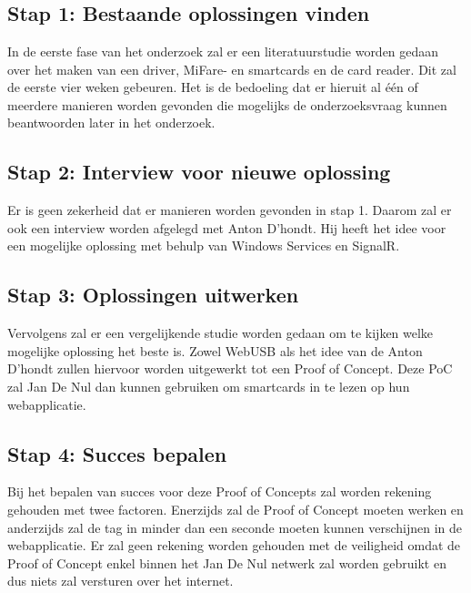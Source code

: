 \graphicspath{{graphics/}}
\chapter{}%
\label{ch:methodologie}

\section{Stap 1: Bestaande oplossingen vinden}
In de eerste fase van het onderzoek zal er een literatuurstudie worden gedaan over het maken van een driver, MiFare- en smartcards en de card reader. Dit zal de eerste vier weken gebeuren. Het is de bedoeling dat er hieruit al één of meerdere manieren worden gevonden die mogelijks de onderzoeksvraag kunnen beantwoorden later in het onderzoek.

\section{Stap 2: Interview voor nieuwe oplossing}
Er is geen zekerheid dat er manieren worden gevonden in stap 1. Daarom zal er ook een interview worden afgelegd met Anton D'hondt. Hij heeft het idee voor een mogelijke oplossing met behulp van Windows Services en SignalR.

\section{Stap 3: Oplossingen uitwerken}
Vervolgens zal er een vergelijkende studie worden gedaan om te kijken welke mogelijke oplossing het beste is. Zowel WebUSB als het idee van de Anton D'hondt zullen hiervoor worden uitgewerkt tot een Proof of Concept. Deze PoC zal Jan De Nul dan kunnen gebruiken om smartcards in te lezen op hun webapplicatie.

\section{Stap 4: Succes bepalen}
Bij het bepalen van succes voor deze Proof of Concepts zal worden rekening gehouden met twee factoren. Enerzijds zal de Proof of Concept moeten werken en anderzijds zal de tag in minder dan een seconde moeten kunnen verschijnen in de webapplicatie. Er zal geen rekening worden gehouden met de veiligheid omdat de Proof of Concept enkel binnen het Jan De Nul netwerk zal worden gebruikt en dus niets zal versturen over het internet.


